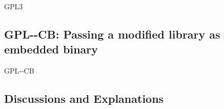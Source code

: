 \begin{license}{GPL3}
\subsection{GPL-\ver-CB: Passing a modified library as embedded binary}
\begin{lsuc}{GPL-\ver-CB}

  \useCaseB{\ver}
  \coversB

  \begin{lsucrequires}
    \lsucmandatory{\keepLicenseElements}
    \lsucmandatory{\gplthreeEnsureCopyrightNoticeBinary}
    \lsucmandatory{\giveLicense}\passingFilesCorrectly
    \lsucmandatory{\retainCopyrightNotices}
    \lsucmandatory{\makeAllSourcesAvailable}
    \lsucmandatory{\describeHowToGetSource}
    \lsucmandatory{\addToCopyrightDialogLib}
    \lsucmandatory{\markEmbeddedModifications}
    \lsucmandatory{\arrangeEmbeddedChanges}\howToApplyTheseTerms
    \lsucmandatory{\arrangeEnclosingBinaries}
    \lsucoptional{\createChangelog}
    \lsucoptional{\addToDocumentation}
  \end{lsucrequires}

  \begin{lsucprohibits}
    \lsucitem{\noPatentLitigation}
  \end{lsucprohibits}
\end{lsuc}

\end{license}


\subsection{Discussions and Explanations}

\newcommand{\gplTwoAndThree}[2]{\footnote{%
    For GPL-2.0 see \cite[cf.][\nopage wp.\ #1]{Gpl20OsiLicense1991a}.\par\noindent 
    For GPL-3.0 see \cite[cf.][\nopage wp.\ #2]{Gpl30OsiLicense2007a}.}} 

